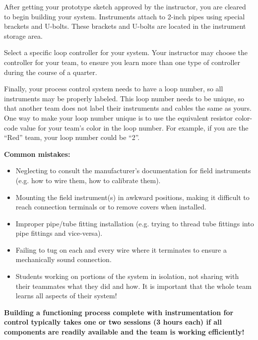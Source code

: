 After getting your prototype sketch approved by the instructor, you are cleared to begin building your system.  Instruments attach to 2-inch pipes using special brackets and U-bolts.  These brackets and U-bolts are located in the instrument storage area.  

Select a specific loop controller for your system.  Your instructor may choose the controller for your team, to ensure you learn more than one type of controller during the course of a quarter.

Finally, your process control system needs to have a loop number, so all instruments may be properly labeled.  This loop number needs to be unique, so that another team does not label their instruments and cables the same as yours.  One way to make your loop number unique is to use the equivalent resistor color-code value for your team's color in the loop number.  For example, if you are the ``Red'' team, your loop number could be ``2''. 

\vskip 10pt

{\bf Common mistakes:}

\begin{itemize}
\item{} Neglecting to consult the manufacturer's documentation for field instruments (e.g. how to wire them, how to calibrate them).
\item{} Mounting the field instrument(s) in awkward positions, making it difficult to reach connection terminals or to remove covers when installed.
\item{} Improper pipe/tube fitting installation (e.g. trying to thread tube fittings into pipe fittings and vice-versa).
\item{} Failing to tug on each and every wire where it terminates to ensure a mechanically sound connection.
\item{} Students working on portions of the system in isolation, not sharing with their teammates what they did and how.  It is important that the whole team learns all aspects of their system!
\end{itemize}

\vskip 10pt

{\bf Building a functioning process complete with instrumentation for control typically takes one or two sessions (3 hours each) if all components are readily available and the team is working efficiently!}





\vfil \eject

